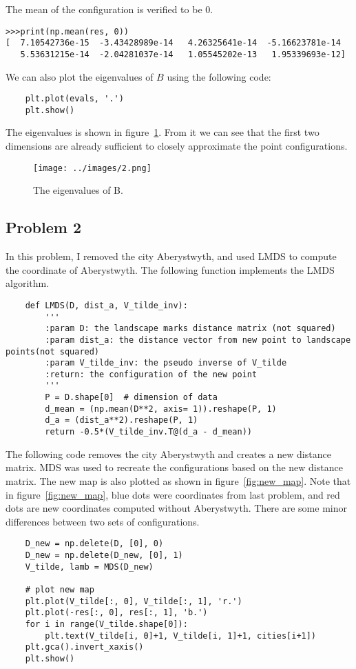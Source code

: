 \documentclass{article}
\begin{document}
The mean of the configuration is verified to be 0.
\begin{lstlisting}
>>>print(np.mean(res, 0))
[  7.10542736e-15  -3.43428989e-14   4.26325641e-14  -5.16623781e-14
   5.53631215e-14  -2.04281037e-14   1.05545202e-13   1.95339693e-12]
\end{lstlisting}
	
We can also plot the eigenvalues of $B$ using the following code:
\begin{lstlisting}
	plt.plot(evals, '.')
	plt.show()
\end{lstlisting}
The eigenvalues is shown in figure~\ref{fig:eval}. From it we can see that the first two dimensions are already sufficient to closely approximate the point configurations. 

\begin{figure}[h!]
\centering
\texttt{[image: ../images/2.png]}
\caption{The eigenvalues of B.}
\label{fig:eval}
\end{figure}

\subsection*{Problem 2}
In this problem, I removed the city Aberystwyth, and used LMDS to compute the coordinate of Aberystwyth.
The following function implements the LMDS algorithm.
\begin{lstlisting}
	def LMDS(D, dist_a, V_tilde_inv):
		'''
		:param D: the landscape marks distance matrix (not squared)
		:param dist_a: the distance vector from new point to landscape points(not squared)
		:param V_tilde_inv: the pseudo inverse of V_tilde
		:return: the configuration of the new point
		'''
		P = D.shape[0]  # dimension of data
		d_mean = (np.mean(D**2, axis= 1)).reshape(P, 1)
		d_a = (dist_a**2).reshape(P, 1)
		return -0.5*(V_tilde_inv.T@(d_a - d_mean))
\end{lstlisting}
The following code removes the city Aberystwyth and creates a new distance matrix. MDS was used to recreate the configurations based on the new distance matrix. The new map is also plotted as shown in figure~\ref{fig:new_map}. Note that in figure~\ref{fig:new_map}, blue dots were coordinates from last problem, and red dots are new coordinates computed without Aberystwyth. There are some minor differences between two sets of configurations. 
\begin{lstlisting}
	D_new = np.delete(D, [0], 0)
	D_new = np.delete(D_new, [0], 1)
	V_tilde, lamb = MDS(D_new)
	
	# plot new map
	plt.plot(V_tilde[:, 0], V_tilde[:, 1], 'r.')
	plt.plot(-res[:, 0], res[:, 1], 'b.')
	for i in range(V_tilde.shape[0]):
		plt.text(V_tilde[i, 0]+1, V_tilde[i, 1]+1, cities[i+1])
	plt.gca().invert_xaxis()
	plt.show()
\end{lstlisting}
\end{document}
